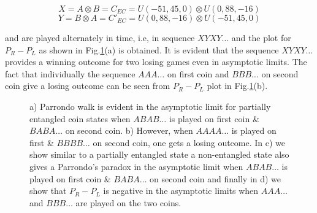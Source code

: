 \documentclass[english,aps,pra,amsmath,amssymb,showpacs,notitlepage,onecolumn]{revtex4-1}
\begin{document}
\begin{equation*}
X=A \otimes B =C_{EC}=U(-51,45,0) \otimes U(0,88,-16)
\end{equation*}
\begin{equation*}
Y=B \otimes A =C'_{EC}=U(0,88,-16) \otimes U(-51,45,0)
\end{equation*}

and are played alternately in time, i.e, in sequence $XYXY\ldots$ and the plot for $P_R -P_L$ as shown in Fig.\ref{result}(a) is obtained. It is evident that the sequence $XYXY\ldots$ provides a winning outcome for two losing games even in asymptotic limits. The fact that individually the sequence $AAA\ldots$ on first coin and $BBB\ldots$ on second coin give a losing outcome can be seen from $P_R-P_L$ plot in Fig.\ref{result}(b).
\begin{figure}[H]
 \centering {}
 \centering    {}
 \centering    {}
 \centering    {}
 \caption{a) Parrondo walk is evident in the asymptotic limit for partially entangled coin states when $ABAB\ldots$ is played on first coin \& $BABA\ldots$ on second coin. b) However, when $AAAA\ldots$ is played on first \& $BBBB\ldots$ on second coin, one gets a losing outcome.  In c) we show similar to a partially entangled state a non-entangled state also gives a Parrondo's paradox in the asymptotic limit when $ABAB\ldots$ is played on first coin \& $BABA\ldots$ on second coin and finally in d) we show that $P_R-P_L$ is negative in the asymptotic limits when $AAA\ldots$ and $BBB\ldots$ are played on the two coins.}\label{result}
\end{figure}
\end{document}
